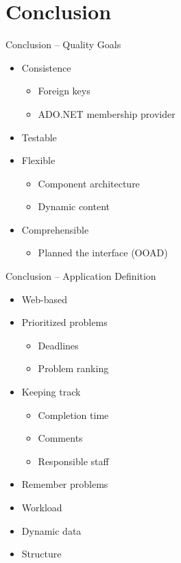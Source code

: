 \section*{Conclusion}
\begin{frame}{Conclusion -- Quality Goals}

\begin{itemize}
	\item Consistence
	\begin{itemize}
		\item Foreign keys
		\item ADO.NET membership provider
	\end{itemize}
	\item<2-> Testable 
	\item<3-> Flexible
	\begin{itemize}
		\item Component architecture
		\item Dynamic content
	\end{itemize}
	\item<4-> Comprehensible
	\begin{itemize}
		\item Planned the interface (OOAD)
	\end{itemize}
\end{itemize}
\end{frame}

\begin{frame}{Conclusion -- Application Definition}

	\begin{itemize}
	\item Web-based 
	\item<2-> Prioritized problems
	\begin{itemize}
		\item<2-> Deadlines
		\item<2-> Problem ranking
	\end{itemize}
	\item<3-> Keeping track
	\begin{itemize}
		\item<3-> Completion time
		\item<3-> Comments
		\item<3-> Responsible staff
	\end{itemize}	
	\item<4-> Remember problems
	\item<5-> Workload
	\item<6-> Dynamic data
	\item<7-> Structure
\end{itemize}
\end{frame}
